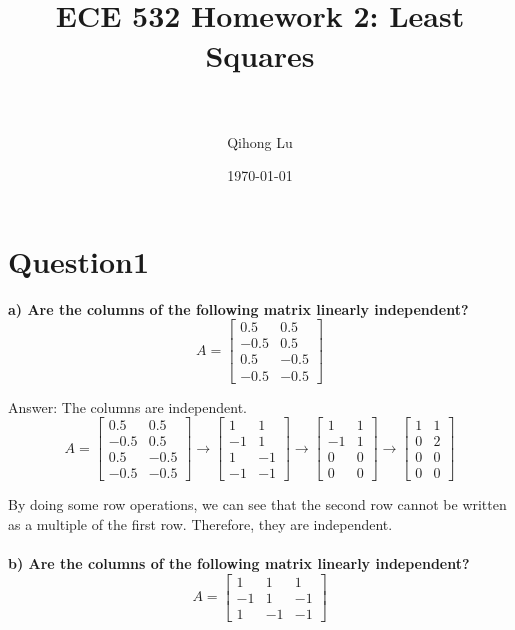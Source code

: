 \documentclass[paper=a4, fontsize=11pt]{scrartcl} %
\title{	
\normalfont \normalsize 
\horrule{0.5pt} \\[0.4cm] %
\huge ECE 532 Homework 2: Least Squares \\ %
\horrule{2pt} \\[0.5cm] %
}
\author{Qihong Lu} %
\date{\normalsize\today} %
\numberwithin{equation}{section} %
\numberwithin{figure}{section} %
\numberwithin{table}{section} %
\begin{document}
\maketitle %


\section*{Question1}
\textbf{a) Are the columns of the following matrix linearly independent?}
$$
A = 
\begin{bmatrix}
0.5 & 0.5 \\
-0.5 & 0.5 \\
0.5 & -0.5 \\
-0.5 & -0.5 
\end{bmatrix}
$$

Answer: The columns are independent. 
$$
A = 
\begin{bmatrix}
0.5 & 0.5 \\
-0.5 & 0.5 \\
0.5 & -0.5 \\
-0.5 & -0.5 
\end{bmatrix}
\rightarrow
\begin{bmatrix}
1 & 1 \\
-1 & 1 \\
1 & -1 \\
-1 & -1 
\end{bmatrix}
\rightarrow
\begin{bmatrix}
1 & 1 \\
-1 & 1 \\
0 & 0 \\
0 & 0
\end{bmatrix}
\rightarrow
\begin{bmatrix}
1 & 1 \\
0 & 2 \\
0 & 0 \\
0 & 0
\end{bmatrix}
$$

By doing some row operations, we can see that the second row cannot be written as a multiple of the first row. Therefore, they are independent. \\\\

\textbf{b) Are the columns of the following matrix linearly independent?} 
$$
A = 
\begin{bmatrix}
1 & 1 & 1 \\
-1 & 1 & -1 \\
1 & -1 & -1 
\end{bmatrix}
$$
\end{document}
